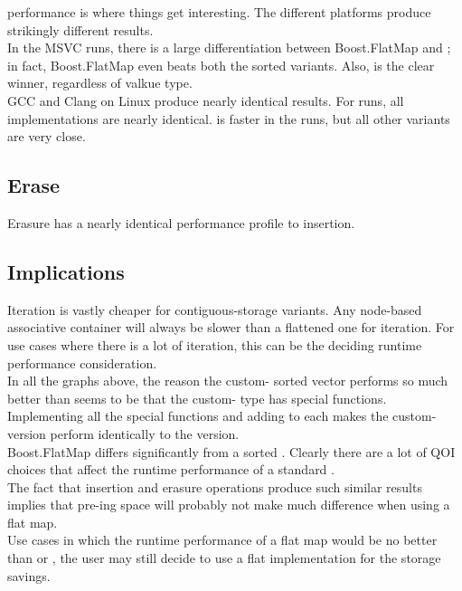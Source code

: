  performance is where things get interesting.  The different
platforms produce strikingly different results.\\

In the MSVC runs, there is a large differentiation between Boost.FlatMap and
; in fact, Boost.FlatMap even beats both the sorted 
variants.  Also,  is the clear winner, regardless of
valkue type.\\

GCC and Clang on Linux produce nearly identical results.  For  runs, all implementations are nearly identical.  
is faster in the  runs, but all other
variants are very close.

\subsection{Erase}


Erasure has a nearly identical performance profile to insertion.\\


\subsection{Implications}

Iteration is vastly cheaper for contiguous-storage variants.  Any node-based
associative container will always be slower than a flattened one for
iteration.  For use cases where there is a lot of iteration, this can be the
deciding runtime performance consideration.\\

In all the graphs above, the reason the custom- sorted vector
performs so much better than  seems to be that
the custom- type has  special functions.
Implementing all the special functions and adding  to
each makes the custom- version perform identically to the
 version.\\

Boost.FlatMap differs significantly from a sorted .  Clearly
there are a lot of QOI choices that affect the runtime performance of a
standard .\\

The fact that insertion and erasure operations produce such similar results
implies that pre-ing space will probably not make much
difference when using a flat map.\\

Use cases in which the runtime performance of a flat map would be no better
than  or , the user may still decide to use a
flat implementation for the storage savings.
